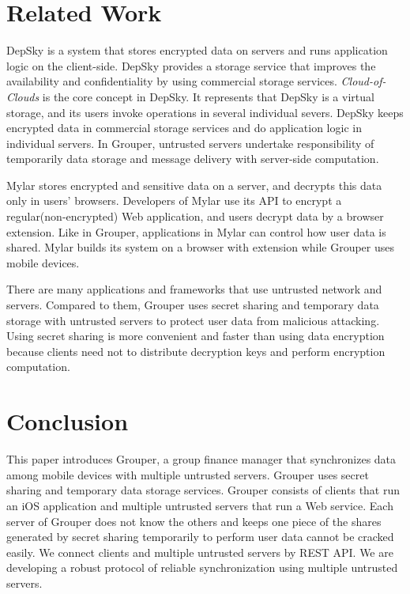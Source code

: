 \documentclass[twocolumn,10pt]{article}
\begin{document}
\section{Related Work}

DepSky\cite{bessani2013depsky} is a system that stores encrypted data on servers and runs application logic on the client-side. DepSky provides a storage service that improves the availability and confidentiality by using commercial storage services. \emph{Cloud-of-Clouds} is the core concept in DepSky. It represents that DepSky is a virtual storage, and its users invoke operations in several individual severs. DepSky keeps encrypted data in commercial storage services and do application logic in individual servers. In Grouper,  untrusted servers undertake responsibility of temporarily data storage and message delivery with server-side computation.

Mylar\cite{popa2014building} stores encrypted and sensitive data on a server, and decrypts this data only in users’ browsers. Developers of Mylar use its API to encrypt a regular(non-encrypted) Web application, and users decrypt data by a browser extension. Like in Grouper, applications in Mylar can control how user data is shared. Mylar builds its system on a browser with extension while Grouper uses mobile devices.

There are many applications and frameworks that use untrusted network and servers. Compared to them, Grouper uses secret sharing and temporary data storage with untrusted servers to protect user data from malicious attacking. Using secret sharing is more convenient and faster than using data encryption because clients need not to distribute decryption keys and perform encryption computation.

\section{Conclusion}

This paper introduces Grouper, a group finance manager that synchronizes data among mobile devices with multiple untrusted servers. Grouper uses secret sharing and temporary data storage services. Grouper consists of clients that run an iOS application and multiple untrusted servers that run a Web service. Each server of Grouper does not know the others and keeps one piece of the shares generated by secret sharing temporarily to perform user data cannot be cracked easily. We connect clients and multiple untrusted servers by REST API. We are developing a robust protocol of reliable synchronization using multiple untrusted servers.


{
	\footnotesize
	
}
\end{document}
